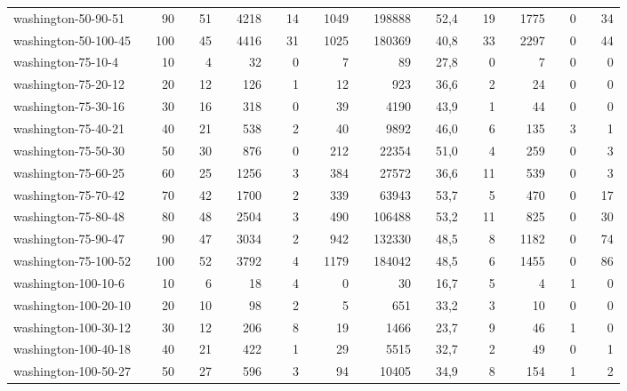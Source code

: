 \begin{table}[!ht]
{\begin{tabular}{llrlrlrlrlrlrlrlrlrlrlr}
washington-50-90-51 &  & 90 &  & 51 &  & 4218 &  & 14 &  & 1049 &  & 198888 &  & 52,4 &  & 19 &  & 1775 &  & 0 &  & 34 \\
washington-50-100-45 &  & 100 &  & 45 &  & 4416 &  & 31 &  & 1025 &  & 180369 &  & 40,8 &  & 33 &  & 2297 &  & 0 &  & 44 \\ \hline
washington-75-10-4 &  & 10 &  & 4 &  & 32 &  & 0 &  & 7 &  & 89 &  & 27,8 &  & 0 &  & 7 &  & 0 &  & 0 \\
washington-75-20-12 &  & 20 &  & 12 &  & 126 &  & 1 &  & 12 &  & 923 &  & 36,6 &  & 2 &  & 24 &  & 0 &  & 0 \\
washington-75-30-16 &  & 30 &  & 16 &  & 318 &  & 0 &  & 39 &  & 4190 &  & 43,9 &  & 1 &  & 44 &  & 0 &  & 0 \\
washington-75-40-21 &  & 40 &  & 21 &  & 538 &  & 2 &  & 40 &  & 9892 &  & 46,0 &  & 6 &  & 135 &  & 3 &  & 1 \\
washington-75-50-30 &  & 50 &  & 30 &  & 876 &  & 0 &  & 212 &  & 22354 &  & 51,0 &  & 4 &  & 259 &  & 0 &  & 3 \\
washington-75-60-25 &  & 60 &  & 25 &  & 1256 &  & 3 &  & 384 &  & 27572 &  & 36,6 &  & 11 &  & 539 &  & 0 &  & 3 \\
washington-75-70-42 &  & 70 &  & 42 &  & 1700 &  & 2 &  & 339 &  & 63943 &  & 53,7 &  & 5 &  & 470 &  & 0 &  & 17 \\
washington-75-80-48 &  & 80 &  & 48 &  & 2504 &  & 3 &  & 490 &  & 106488 &  & 53,2 &  & 11 &  & 825 &  & 0 &  & 30 \\
washington-75-90-47 &  & 90 &  & 47 &  & 3034 &  & 2 &  & 942 &  & 132330 &  & 48,5 &  & 8 &  & 1182 &  & 0 &  & 74 \\
washington-75-100-52 &  & 100 &  & 52 &  & 3792 &  & 4 &  & 1179 &  & 184042 &  & 48,5 &  & 6 &  & 1455 &  & 0 &  & 86 \\ \hline
washington-100-10-6 &  & 10 &  & 6 &  & 18 &  & 4 &  & 0 &  & 30 &  & 16,7 &  & 5 &  & 4 &  & 1 &  & 0 \\
washington-100-20-10 &  & 20 &  & 10 &  & 98 &  & 2 &  & 5 &  & 651 &  & 33,2 &  & 3 &  & 10 &  & 0 &  & 0 \\
washington-100-30-12 &  & 30 &  & 12 &  & 206 &  & 8 &  & 19 &  & 1466 &  & 23,7 &  & 9 &  & 46 &  & 1 &  & 0 \\
washington-100-40-18 &  & 40 &  & 21 &  & 422 &  & 1 &  & 29 &  & 5515 &  & 32,7 &  & 2 &  & 49 &  & 0 &  & 1 \\
washington-100-50-27 &  & 50 &  & 27 &  & 596 &  & 3 &  & 94 &  & 10405 &  & 34,9 &  & 8 &  & 154 &  & 1 &  & 2 \\

\end{tabular}}
\end{table}
